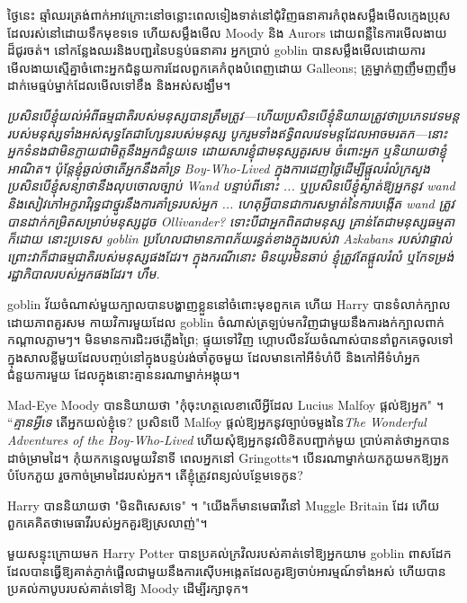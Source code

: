 ថ្ងៃនេះ ឆ្មាំឈរត្រង់ពាក់អាវក្រោះនៅចន្លោះពេលទៀងទាត់នៅជុំវិញធនាគារកំពុងសម្លឹងមើលក្មេងប្រុសដែលរស់នៅដោយទឹកមុខទទេ ហើយសម្លឹងមើល Moody និង Aurors ដោយពន្លឺនៃការមើលងាយដ៏ជូរចត់។ នៅ​កន្លែង​ឈរ​និង​បញ្ជរ​នៃ​បន្ទប់​ធនាគារ អ្នក​ប្រាប់ goblin បាន​សម្លឹង​មើល​ដោយ​ការ​មើលងាយ​ស្មើ​គ្នា​ចំពោះ​អ្នក​ជំនួយ​ការ​ដែល​ពួកគេ​កំពុង​បំពេញ​ដោយ Galleons; គ្រូម្នាក់ញញឹមញញឹមដាក់មេធ្មប់ម្នាក់ដែលមើលទៅខឹង និងអស់សង្ឃឹម។

\emph{ប្រសិនបើខ្ញុំយល់អំពីធម្មជាតិរបស់មនុស្សបានត្រឹមត្រូវ—ហើយប្រសិនបើខ្ញុំនិយាយត្រូវថាប្រភេទវេទមន្តរបស់មនុស្សទាំងអស់សុទ្ធតែជាហ្សែនរបស់មនុស្ស បូករួមទាំងឥទ្ធិពលវេទមន្តដែលអាចមរតក—នោះអ្នកទំនងជាមិនក្លាយជាមិត្តនឹងអ្នកជំនួយទេ ដោយសារខ្ញុំជាមនុស្សគួរសម ចំពោះអ្នក ឬនិយាយថាខ្ញុំអាណិត។ ប៉ុន្តែខ្ញុំឆ្ងល់ថាតើអ្នកនឹងគាំទ្រ Boy-Who-Lived ក្នុងការដេញថ្លៃដើម្បីផ្តួលរំលំក្រសួងប្រសិនបើខ្ញុំសន្យាថានឹងលុបចោលច្បាប់ Wand បន្ទាប់ពីនោះ ... ឬប្រសិនបើខ្ញុំស្ងាត់ឱ្យអ្នកនូវ wand និងសៀវភៅអក្ខរាវិរុទ្ធជាថ្នូរនឹងការគាំទ្ររបស់អ្នក ... ហេតុ​អ្វី​បាន​ជា​ការ​សម្ងាត់​នៃ​ការ​បង្កើត wand ត្រូវ​បាន​ដាក់​កម្រិត​សម្រាប់​មនុស្ស​ដូច Ollivander? ទោះបីជាអ្នកពិតជាមនុស្ស គ្រាន់តែជាមនុស្សធម្មតាក៏ដោយ នោះប្រទេស goblin ប្រហែលជាមានភាពភ័យរន្ធត់ខាងក្នុងរបស់វា Azkabans របស់វាផ្ទាល់ ព្រោះវាក៏ជាធម្មជាតិរបស់មនុស្សផងដែរ។ ក្នុងករណីនោះ មិនយូរមិនឆាប់ ខ្ញុំត្រូវតែផ្តួលរំលំ ឬកែទម្រង់រដ្ឋាភិបាលរបស់អ្នកផងដែរ។ ហឹម.}

goblin វ័យចំណាស់មួយក្បាលបានបង្ហាញខ្លួននៅចំពោះមុខពួកគេ ហើយ Harry បានទំលាក់ក្បាលដោយភាពគួរសម កាយវិការមួយដែល goblin ចំណាស់ត្រឡប់មកវិញជាមួយនឹងការងក់ក្បាលពាក់កណ្តាលភ្លាមៗ។ មិនមានការជិះរថភ្លើងព្រៃ; ផ្ទុយទៅវិញ ហ្គោបលីនវ័យចំណាស់បាននាំពួកគេចូលទៅក្នុងសាលខ្លីមួយដែលបញ្ចប់នៅក្នុងបន្ទប់រង់ចាំតូចមួយ ដែលមានកៅអីទំហំបី និងកៅអីទំហំអ្នកជំនួយការមួយ ដែលក្នុងនោះគ្មាននរណាម្នាក់អង្គុយ។

Mad-Eye Moody បាននិយាយថា "កុំចុះហត្ថលេខាលើអ្វីដែល Lucius Malfoy ផ្តល់ឱ្យអ្នក" ។ “\emph{គ្មានអ្វីទេ} តើអ្នកយល់ខ្ញុំទេ? ប្រសិនបើ Malfoy ផ្តល់ឱ្យអ្នកនូវច្បាប់ចម្លងនៃ\emph{The Wonderful Adventures of the Boy-Who-Lived} ហើយសុំឱ្យអ្នកនូវលិខិតបញ្ជាក់មួយ ប្រាប់គាត់ថាអ្នកបានដាច់ម្រាមដៃ។ កុំ​យក​កន្ទេល​មួយ​វិនាទី ពេល​អ្នក​នៅ Gringotts។ បើ​នរណា​ម្នាក់​យក​ភួយ​មក​ឱ្យ​អ្នក បំបែក​ភួយ រួច​កាច់​ម្រាមដៃ​របស់​អ្នក​។ តើខ្ញុំត្រូវពន្យល់បន្ថែមទេកូន?

Harry បាននិយាយថា "មិនពិសេសទេ" ។ "យើងក៏មានមេធាវីនៅ Muggle Britain ដែរ ហើយពួកគេគិតថាមេធាវីរបស់អ្នកគួរឱ្យស្រលាញ់"។

មួយសន្ទុះក្រោយមក Harry Potter បានប្រគល់ក្រវិលរបស់គាត់ទៅឱ្យអ្នកយាម goblin ពាសដែក ដែលបានធ្វើឱ្យគាត់ភ្ញាក់ផ្អើលជាមួយនឹងការស៊ើបអង្កេតដែលគួរឱ្យចាប់អារម្មណ៍ទាំងអស់ ហើយបានប្រគល់កាបូបរបស់គាត់ទៅឱ្យ Moody ដើម្បីរក្សាទុក។

